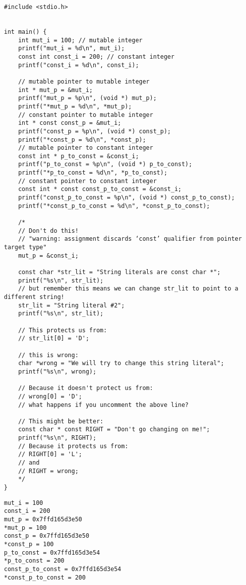 \documentclass[11pt]{article}
\begin{document}
\begin{verbatim}
#include <stdio.h>


int main() {
    int mut_i = 100; // mutable integer
    printf("mut_i = %d\n", mut_i);
    const int const_i = 200; // constant integer
    printf("const_i = %d\n", const_i);

    // mutable pointer to mutable integer
    int * mut_p = &mut_i;
    printf("mut_p = %p\n", (void *) mut_p);
    printf("*mut_p = %d\n", *mut_p);
    // constant pointer to mutable integer
    int * const const_p = &mut_i;
    printf("const_p = %p\n", (void *) const_p);
    printf("*const_p = %d\n", *const_p);
    // mutable pointer to constant integer
    const int * p_to_const = &const_i;
    printf("p_to_const = %p\n", (void *) p_to_const);
    printf("*p_to_const = %d\n", *p_to_const);
    // constant pointer to constant integer
    const int * const const_p_to_const = &const_i;
    printf("const_p_to_const = %p\n", (void *) const_p_to_const);
    printf("*const_p_to_const = %d\n", *const_p_to_const);

    /*
    // Don't do this!
    // "warning: assignment discards ‘const’ qualifier from pointer target type"
    mut_p = &const_i;

    const char *str_lit = "String literals are const char *";
    printf("%s\n", str_lit);
    // but remember this means we can change str_lit to point to a different string!
    str_lit = "String literal #2";
    printf("%s\n", str_lit);

    // This protects us from:
    // str_lit[0] = 'D';

    // this is wrong:
    char *wrong = "We will try to change this string literal";
    printf("%s\n", wrong);

    // Because it doesn't protect us from:
    // wrong[0] = 'D';
    // what happens if you uncomment the above line?

    // This might be better:
    const char * const RIGHT = "Don't go changing on me!";
    printf("%s\n", RIGHT);
    // Because it protects us from:
    // RIGHT[0] = 'L';
    // and
    // RIGHT = wrong;
    */
}
\end{verbatim}

\begin{verbatim}
mut_i = 100
const_i = 200
mut_p = 0x7ffd165d3e50
*mut_p = 100
const_p = 0x7ffd165d3e50
*const_p = 100
p_to_const = 0x7ffd165d3e54
*p_to_const = 200
const_p_to_const = 0x7ffd165d3e54
*const_p_to_const = 200
\end{verbatim}
\end{document}
